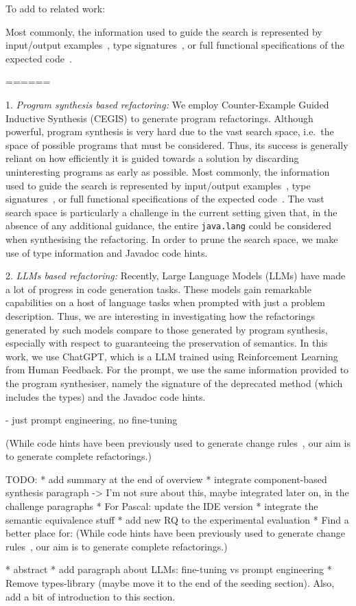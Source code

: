 To add to related work:

Most commonly, the information used to guide the search is represented by input/output examples~\cite{DBLP:conf/pldi/FeserCD15}, type signatures~\cite{DBLP:conf/pldi/OseraZ15}, or full functional specifications of the expected code~\cite{DBLP:conf/ijcai/MannaW79}.


======

1. {\em Program synthesis based refactoring:} 
We employ Counter-Example Guided Inductive Synthesis (CEGIS) to generate program refactorings. 
%
Although powerful, program synthesis is very hard due to the vast search space, i.e.~the space of possible programs that must be considered. Thus, its success is generally reliant on how efficiently it is guided towards a solution by discarding uninteresting programs as early as possible. Most commonly, the information used to guide the search is represented by input/output examples~\cite{DBLP:conf/pldi/FeserCD15}, type signatures~\cite{DBLP:conf/pldi/OseraZ15}, or full functional specifications of the expected code~\cite{DBLP:conf/ijcai/MannaW79}.
%
The vast search space is particularly a challenge in the current
setting given that, in the absence of any additional guidance, the
entire \texttt{java.lang} could be considered when synthesising the
refactoring.  In order to prune the search space, we make use of type information and Javadoc code hints.

2. {\em LLMs based refactoring:} 
Recently, Large Language Models (LLMs) have made a lot of progress in code generation tasks. 
These models gain remarkable capabilities on a host of language tasks when prompted with just a problem description.
Thus, we are interesting in investigating how the refactorings generated by such models compare to those generated by program synthesis,
especially with respect to guaranteeing the preservation of semantics. In this work, we use
ChatGPT, which is a LLM trained using Reinforcement Learning from Human Feedback.
%
For the prompt, we use the same information provided to the program synthesiser, namely the signature of the deprecated method (which includes the types) and the Javadoc code hints.

- just prompt engineering, no fine-tuning

(While code hints have been previously used to generate change rules~\cite{DBLP:conf/kbse/Huang0PW021}, our aim is to generate complete refactorings.)

TODO:
* add summary at the end of overview
* integrate component-based synthesis paragraph -> I'm not sure about this, maybe integrated later on, in the challenge paragraphs
* For Pascal: update the IDE version
* integrate the semantic equivalence stuff
* add new RQ to the experimental evaluation
* Find a better place for: (While code hints have been previously used to generate change rules~\cite{DBLP:conf/kbse/Huang0PW021}, our aim is to generate complete refactorings.)


* abstract
* add paragraph about LLMs: fine-tuning vs prompt engineering
* Remove types-library (maybe move it to the end of the seeding section). Also, add a bit of introduction to this section.
